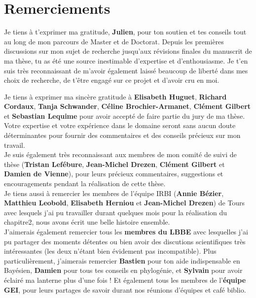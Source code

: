 \thispagestyle{empty}
\section*{Remerciements}

Je tiens à t'exprimer ma gratitude, \textbf{Julien}, pour ton soutien et tes conseils tout au long de mon parcours de Master et de Doctorat. Depuis les premières discussions sur mon sujet de recherche jusqu'aux révisions finales du manuscrit de ma thèse, tu as été une source inestimable d'expertise et d'enthousiasme. Je t’en suis très reconnaissant de m’avoir également laissé beaucoup de liberté dans mes choix de recherche, de t’être engagé sur ce projet et d'avoir cru en moi.\newline

Je tiens à exprimer ma sincère gratitude à \textbf{Elisabeth Huguet}, \textbf{Richard Cordaux}, \textbf{Tanja Schwander}, \textbf{Céline Brochier-Armanet}, \textbf{Clément Gilbert} et \textbf{Sebastian Lequime} pour avoir accepté de faire partie du jury de ma thèse. Votre expertise et votre expérience dans le domaine seront sans aucun doute déterminantes pour fournir des commentaires et des conseils précieux sur mon travail.\\

Je suis également très reconnaissant aux membres de mon comité de suivi de thèse (\textbf{Tristan Lefébure}, \textbf{Jean-Michel Drezen}, \textbf{Clément Gilbert} et \textbf{Damien de Vienne}), pour leurs précieux commentaires, suggestions et encouragements pendant la réalisation de cette thèse.\\

Je tiens aussi à remercier les membres de l'équipe IRBI (\textbf{Annie Bézier}, \textbf{Matthieu Leobold}, \textbf{Elisabeth Herniou} et \textbf{Jean-Michel Drezen}) de Tours avec lesquels j'ai pu travailler durant quelques mois pour la réalisation du chapitre2, nous avons écrit une belle histoire ensemble. \\

J’aimerais également remercier tous les \textbf{membres du LBBE} avec lesquelles j’ai pu partager des moments détentes ou bien avoir des discutions scientifiques très intéressantes (les deux n’étant bien évidement pas incompatible). Plus particulièrement, j’aimerais remercier \textbf{Bastien} pour ton aide indispensable en Bayésien, \textbf{Damien} pour tous tes conseils en phylogénie, et \textbf{Sylvain} pour avoir éclairé ma lanterne plus d'une fois ! Et également tous les membres de l’\textbf{équipe GEI}, pour leurs partages de savoir durant nos réunions d’équipes et café biblio.\\

